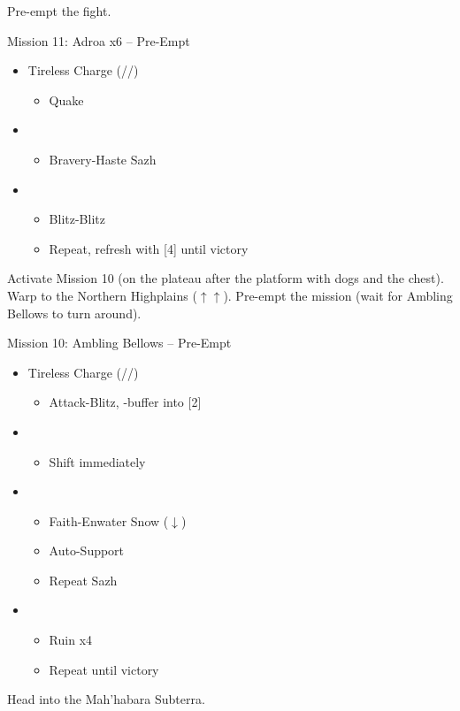 \renewcommand{\third}{[3] Hero's Charge (\syn/\med/\com)}
\renewcommand{\fourth}{[4] Tireless Charge (\com/\med/\com)}

Pre-empt the fight.

\begin{battle}{Mission 11: Adroa x6 -- Pre-Empt}
	\begin{itemize}
		\item \fourth
			\begin{itemize}
				\item Quake
			\end{itemize}
		\item \first
			\begin{itemize}
				\item Bravery-Haste Sazh
			\end{itemize}
		\item \fifth
			\begin{itemize}
				\item Blitz-Blitz
				\item Repeat, refresh with [4] until victory
			\end{itemize}
	\end{itemize}
\end{battle}

Activate Mission 10 (on the plateau after the platform with dogs and the chest).
Warp to the Northern Highplains ($\uparrow\uparrow$).
Pre-empt the mission (wait for Ambling Bellows to turn around).

\begin{battle}{Mission 10: Ambling Bellows -- Pre-Empt}
	\begin{itemize}
		\item \fourth
			\begin{itemize}
				\item Attack-Blitz, \rav-buffer into [2]
			\end{itemize}
		\item \second
			\begin{itemize}
				\item Shift immediately
			\end{itemize}
		\item \first
			\begin{itemize}
				\item Faith-Enwater Snow ($\downarrow$)
				\item Auto-Support
				\item Repeat Sazh
			\end{itemize}
		\item \fifth
			\begin{itemize}
				\item Ruin x4
				\item Repeat until victory
			\end{itemize}
	\end{itemize}
\end{battle}

Head into the Mah'habara Subterra.